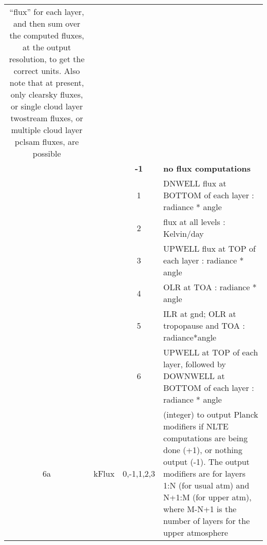 \documentclass[12pt]{article}
\newlength{\colwidth}
\newlength{\colwidthshort}
\begin{document}
\begin{small}
\begin{longtable}{|c|c|c|p{\colwidthshort}|}
   ``flux'' for each layer, and then sum over the computed fluxes, at the 
    output resolution, to get the correct units. Also note that at present, 
    only clearsky fluxes, or single cloud layer twostream fluxes, or multiple 
    cloud layer pclsam fluxes, are possible\\
   &  & {\bf -1}  & {\bf no flux computations} \\
   &             & 1 & DNWELL flux at BOTTOM of each layer : radiance * angle\\
   &             & 2 & flux at all levels : Kelvin/day\\ 
   &             & 3 & UPWELL flux at TOP of each layer : radiance * angle\\
   &             & 4 & OLR  at TOA : radiance * angle\\
   &             & 5 & ILR at gnd; OLR at tropopause and TOA : radiance*angle\\
   &             & 6 & UPWELL at TOP of each layer, followed by DOWNWELL at BOTTOM of each layer : radiance * angle\\
\hline
6a & {\sf kFlux}   & 0,-1,1,2,3 & (integer) to output Planck modifiers if NLTE 
computations are being done (+1), or nothing output (-1). The output modifiers are
for layers 1:N (for usual atm) and N+1:M (for upper atm), where M-N+1 is the number of
layers for the upper atmosphere\\
   

\end{longtable}
\end{small}
\end{document}
